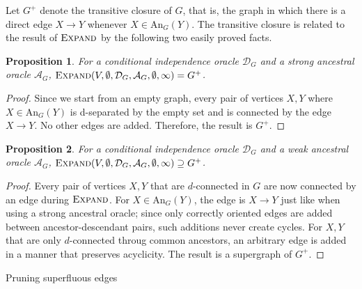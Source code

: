 \documentclass{uai2025} %
\newtheorem{proposition}{Proposition}
\begin{document}
Let $G^+$ denote the transitive closure of $G$, that is, the graph in which 
there is a direct edge $X \to Y$ whenever $X \in \textrm{An}_G(Y)$. The transitive
closure is related to the result of $\textsc{Expand}$ by the following two 
easily proved facts.

\begin{proposition}
For a conditional independence oracle
 $\mathcal{D}_G$ and a strong ancestral oracle $\mathcal{A}_G$, 
$\textsc{Expand}(V,\emptyset,\mathcal{D}_G,\mathcal{A}_G, \emptyset, \infty)=G^+$.
\label{prop:strongexpand}
\end{proposition}

\begin{proof}
Since we start from an empty graph, every pair of vertices $X, Y$ where
 $X \in \textrm{An}_G(Y)$ is d-separated by the empty set and is
 connected by the edge $X \to Y$. No other edges are added. Therefore, 
the result is $G^+$. 
\end{proof}

\begin{proposition}
For a conditional independence oracle
 $\mathcal{D}_G$ and a weak ancestral oracle $\mathcal{A}_G$, 
$\textsc{Expand}(V,\emptyset,\mathcal{D}_G,\mathcal{A}_G, \emptyset, \infty)
\supseteq G^+$.
\label{prop:weakexpand}
\end{proposition}

\begin{proof}
Every pair of vertices $X, Y$ that are $d$-connected in $G$ are now connected by an edge 
during $\textsc{Expand}$. For $X \in \textrm{An}_G(Y)$, the edge is 
$X \to Y$ just like when using a strong ancestral oracle; since only correctly oriented
edges are added between ancestor-descendant pairs, such additions never create cycles.
For $X, Y$ that are only $d$-connected throug common ancestors, an arbitrary 
edge is added in a manner that preserves acyclicity. The result is a supergraph
of $G^+$.
\end{proof}


\begin{algorithm}[h]
\DontPrintSemicolon
\SetAlgoLined

\caption{Pruning superfluous edges}
\label{algo:prune}
\end{algorithm}
\end{document}
